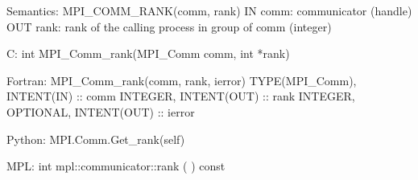 Semantics:
MPI_COMM_RANK(comm, rank)
IN comm: communicator (handle)
OUT rank: rank of the calling process in group of comm (integer)

C:
int MPI_Comm_rank(MPI_Comm comm, int *rank)

Fortran:
MPI_Comm_rank(comm, rank, ierror)
TYPE(MPI_Comm), INTENT(IN) :: comm
INTEGER, INTENT(OUT) :: rank
INTEGER, OPTIONAL, INTENT(OUT) :: ierror

Python:
MPI.Comm.Get_rank(self)

MPL:
int mpl::communicator::rank ( ) const
